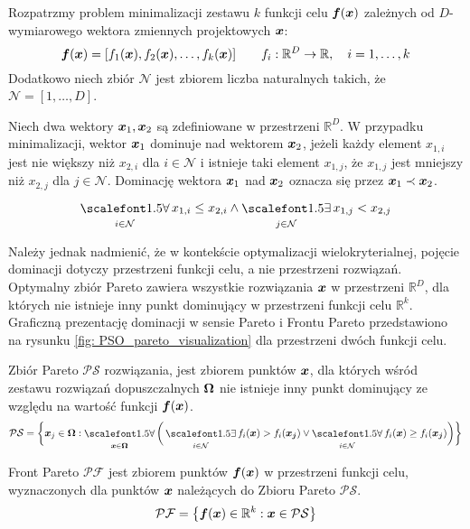 Rozpatrzmy problem minimalizacji zestawu $k$ funkcji celu $\bm{f}(\bm{x})$ zależnych od $D$-wymiarowego wektora zmiennych projektowych $\bm{x}$:
\begin{equation}
	\bm{f}(\bm{x})=[f_1(\bm{x}),f_2(\bm{x}),\dots,f_k(\bm{x})] \qquad f_i:\mathbb{R}^D\rightarrow \mathbb{R},\quad i=1,\dots,k
\end{equation}
Dodatkowo niech zbiór $\mathcal{N}$ jest zbiorem liczba naturalnych takich, że $\mathcal{N}=[1,\dots,D]$.
\begin{definition}
Niech dwa wektory $\bm{x}_1, \bm{x}_2$ są zdefiniowane w przestrzeni $\mathbb{R}^D$. W przypadku minimalizacji, wektor $\bm{x}_1$ dominuje nad wektorem $\bm{x}_2$, jeżeli każdy element $x_{1,i}$ jest nie większy niż $x_{2,i}$ dla $i\in \mathcal{N}$ i istnieje taki element $x_{1,j}$, że $x_{1,j}$ jest mniejszy niż $x_{2,j}$ dla $j\in\mathcal{N}$. Dominację wektora $\bm{x}_1$ nad $\bm{x}_2$ oznacza się przez $\bm{x}_1\prec\bm{x}_2$.
\begin{equation}
	\bigforall_{i\in\mathcal{N}} x_{1,i}\le x_{2,i} \land \bigexists_{j\in\mathcal{N}} x_{1,j}<x_{2,j}
\end{equation}
\end{definition}


Należy jednak nadmienić, że w kontekście optymalizacji wielokryterialnej, pojęcie dominacji dotyczy przestrzeni funkcji celu, a nie przestrzeni rozwiązań. Optymalny zbiór Pareto zawiera wszystkie rozwiązania $\bm{x}$ w przestrzeni $\mathbb{R}^D$, dla których nie istnieje inny punkt dominujący w przestrzeni funkcji celu $\mathbb{R}^k$. Graficzną prezentację dominacji w sensie Pareto i Frontu Pareto przedstawiono na rysunku \ref{fig: PSO_pareto_visualization} dla przestrzeni dwóch funkcji celu.

\begin{definition}
	Zbiór Pareto $\mathcal{PS}$ rozwiązania, jest zbiorem punktów $\bm{x}$, dla których wśród zestawu rozwiązań dopuszczalnych $\bm{\Omega}$ nie istnieje inny punkt dominujący ze względu na wartość funkcji $\bm{f}(\bm{x})$.
	\begin{equation}
		\mathcal{PS} = \bigg\{ 
		\vect{x}_j \in \vect{\Omega}: 
		\bigforall_{\vect{x}\in\vect{\Omega}} \bigg( 
		\bigexists_{i\in\mathcal{N}} f_i(\vect{x})>f_i(\vect{x_j}) \vee
		\bigforall_{i\in\mathcal{N}} f_i(\vect{x})\ge f_i(\vect{x_j})
		\bigg) \bigg\}   
	\end{equation}
\end{definition}
\begin{definition}
	Front Pareto $\mathcal{PF}$ jest zbiorem punktów $\bm{f}(\bm{x})$ w przestrzeni funkcji celu, wyznaczonych dla punktów $\bm{x}$ należących do Zbioru Pareto $\mathcal{PS}$.
	\begin{equation}
		\mathcal{PF} = \big\{ \bm{f}(\bm{x}) \in \mathbb{R}^k: \bm{x}\in \mathcal{PS} \big\}  
	\end{equation}
\end{definition}

